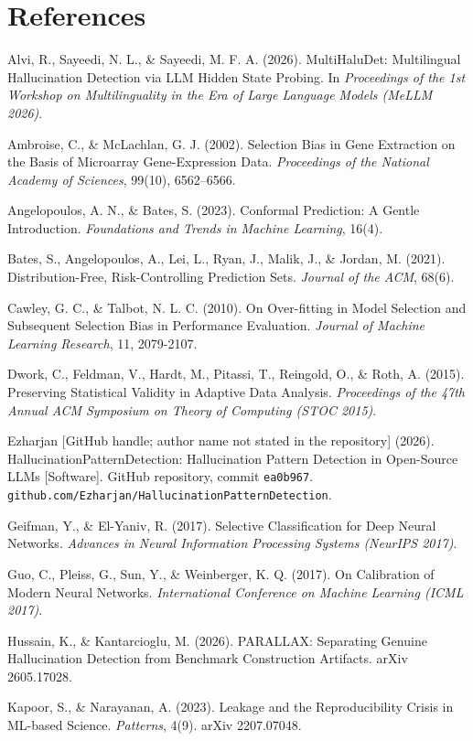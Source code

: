 \documentclass{article}
\begin{document}
\section*{References}

Alvi, R., Sayeedi, N. L., \& Sayeedi, M. F. A. (2026). MultiHaluDet:
Multilingual Hallucination Detection via LLM Hidden State Probing. In
\emph{Proceedings of the 1st Workshop on Multilinguality in the Era of
Large Language Models (MeLLM 2026)}.

Ambroise, C., \& McLachlan, G. J. (2002). Selection Bias in Gene Extraction on
the Basis of Microarray Gene-Expression Data. \emph{Proceedings of the National
Academy of Sciences}, 99(10), 6562--6566.

Angelopoulos, A. N., \& Bates, S. (2023). Conformal Prediction: A Gentle
Introduction. \emph{Foundations and Trends in Machine Learning}, 16(4).

Bates, S., Angelopoulos, A., Lei, L., Ryan, J., Malik, J., \& Jordan, M.
(2021). Distribution-Free, Risk-Controlling Prediction Sets. \emph{Journal
of the ACM}, 68(6).

Cawley, G. C., \& Talbot, N. L. C. (2010). On Over-fitting in Model
Selection and Subsequent Selection Bias in Performance Evaluation.
\emph{Journal of Machine Learning Research}, 11, 2079-2107.

Dwork, C., Feldman, V., Hardt, M., Pitassi, T., Reingold, O., \& Roth, A.
(2015). Preserving Statistical Validity in Adaptive Data Analysis.
\emph{Proceedings of the 47th Annual ACM Symposium on Theory of Computing
(STOC 2015)}.

Ezharjan [GitHub handle; author name not stated in the repository]
(2026). HallucinationPatternDetection: Hallucination Pattern
Detection in Open-Source LLMs [Software]. GitHub repository, commit
\texttt{ea0b967}.
\texttt{github.com/Ezharjan/\allowbreak HallucinationPatternDetection}.

Geifman, Y., \& El-Yaniv, R. (2017). Selective Classification for Deep
Neural Networks. \emph{Advances in Neural Information Processing Systems
(NeurIPS 2017)}.

Guo, C., Pleiss, G., Sun, Y., \& Weinberger, K. Q. (2017). On Calibration
of Modern Neural Networks. \emph{International Conference on Machine
Learning (ICML 2017)}.

Hussain, K., \& Kantarcioglu, M. (2026). PARALLAX: Separating Genuine
Hallucination Detection from Benchmark Construction Artifacts.
arXiv 2605.17028.

Kapoor, S., \& Narayanan, A. (2023). Leakage and the Reproducibility
Crisis in ML-based Science. \emph{Patterns}, 4(9). arXiv 2207.07048.
\end{document}
